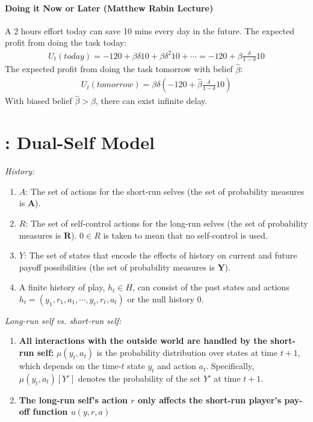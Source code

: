 \documentclass[11pt]{elegantbook}
\begin{document}
\paragraph*{Doing it Now or Later (Matthew Rabin Lecture)}
A 2 hours effort today can save 10 mins every day in the future. The expected profit from doing the task today:
\begin{equation}
    \begin{aligned}
        U_t(today)=-120+\beta \delta 10 + \beta \delta^2 10 + \cdots=-120+\beta\frac{\delta}{1-\delta}10
    \end{aligned}
    \nonumber
\end{equation}
The expected profit from doing the task tomorrow with belief $\hat{\beta}$:
\begin{equation}
    \begin{aligned}
        U_t(tomorrow)=\beta\delta\left(-120+\hat{\beta}\frac{\delta}{1-\delta}10\right)
    \end{aligned}
    \nonumber
\end{equation}
With biased belief $\hat{\beta}>\beta$, there can exist infinite delay.



\section{\cite{fudenberg2006dual}: Dual-Self Model}
\textit{History:}
\begin{enumerate}
    \item $A$: The set of actions for the short-run selves (the set of probability measures is $\mathbf{A}$).
    \item $R$: The set of self-control actions for the long-run selves (the set of probability measures is $\mathbf{R}$). $0\in R$ is taken to mean that no self-control is used.
    \item $Y$: The set of states that encode the effects of history on current and future payoff possibilities (the set of probability measures is $\mathbf{Y}$).
    \item A finite history of play, $h_t\in H$, can consist of the past states and actions $h_t=(y_1,r_1,a_1,\cdots,y_t,r_t,a_t)$ or the null history $0$.
\end{enumerate}

\textit{Long-run self vs. short-run self:}
\begin{enumerate}
    \item \textbf{All interactions with the outside world are handled by the short-run self:} $\mu(y_t,a_t)$ is the probability distribution over states at time $t+1$, which depends on the time-$t$ state $y_t$ and action $a_t$. Specifically, $\mu(y_t,a_t)[Y']$ denotes the probability of the set $Y'$ at time $t+1$.
    \item \textbf{The long-run self's action $r$ only affects the short-run player's pay-off function $u(y,r,a)$}
\end{enumerate}
















\end{document}
